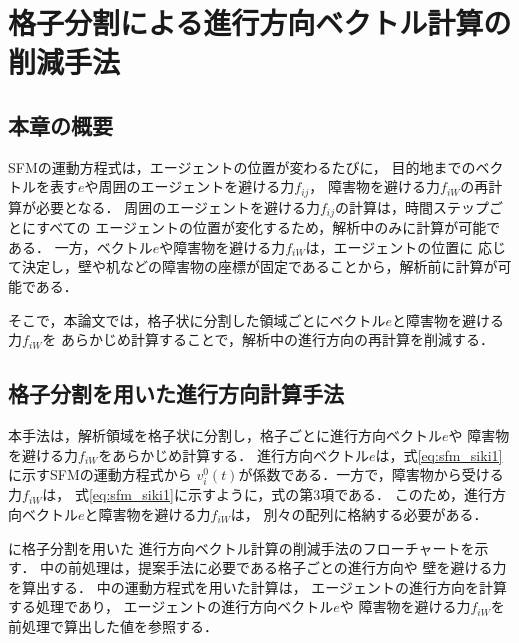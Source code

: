 \chapter{格子分割による進行方向ベクトル計算の削減手法}
\label{sec:method}
\section{本章の概要}
SFMの運動方程式は，エージェントの位置が変わるたびに，
目的地までのベクトルを表す$e$や周囲のエージェントを避ける力$f_{ij}$，
障害物を避ける力$f_{iW}$の再計算が必要となる．
周囲のエージェントを避ける力$f_{ij}$の計算は，時間ステップごとにすべての
エージェントの位置が変化するため，解析中のみに計算が可能である．
一方，ベクトル$e$や障害物を避ける力$f_{iW}$は，エージェントの位置に
応じて決定し，壁や机などの障害物の座標が固定であることから，解析前に計算が可能である．

そこで，本論文では，格子状に分割した領域ごとにベクトル$e$と障害物を避ける力$f_{iW}$を
あらかじめ計算することで，解析中の進行方向の再計算を削減する．

\section{格子分割を用いた進行方向計算手法}
本手法は，解析領域を格子状に分割し，格子ごとに進行方向ベクトル$e$や
障害物を避ける力$f_{iW}$をあらかじめ計算する．
進行方向ベクトル$e$は，式\eqref{eq:sfm_siki1}に示すSFMの運動方程式から
$v_i^0(t)$が係数である．一方で，障害物から受ける力$f_{iW}$は，
式\eqref{eq:sfm_siki1}に示すように，式の第3項である．
このため，進行方向ベクトル$e$と障害物を避ける力$f_{iW}$は，
別々の配列に格納する必要がある．

に格子分割を用いた
進行方向ベクトル計算の削減手法のフローチャートを示す．
中の前処理は，提案手法に必要である格子ごとの進行方向や
壁を避ける力を算出する．
中の運動方程式を用いた計算は，
エージェントの進行方向を計算する処理であり，
エージェントの進行方向ベクトル$e$や
障害物を避ける力$f_{iW}$を前処理で算出した値を参照する．

